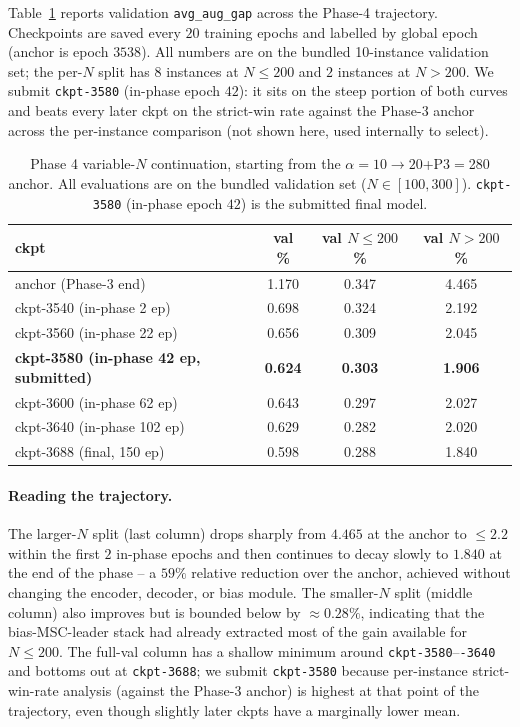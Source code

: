 \documentclass[11pt,a4paper]{article}
\begin{document}
Table~\ref{tab:p4} reports validation \texttt{avg\_aug\_gap} across the
Phase-4 trajectory. Checkpoints are saved every $20$ training epochs and
labelled by global epoch (anchor is epoch $3538$). All numbers are on
the bundled 10-instance validation set; the per-$N$ split has $8$
instances at $N\!\le\!200$ and $2$ instances at $N\!>\!200$. We submit
\texttt{ckpt-3580} (in-phase epoch $42$): it sits on the steep portion
of both curves and beats every later ckpt on the strict-win rate against
the Phase-3 anchor across the per-instance comparison (not shown here,
used internally to select).

\begin{table}[t]
\centering
\caption{Phase 4 variable-$N$ continuation, starting from the
$\alpha\!=\!10\!\to\!20$+P3$=$280 anchor. All evaluations are on the
bundled validation set ($N\!\in\![100,300]$). \texttt{ckpt-3580}
(in-phase epoch $42$) is the submitted final model.}
\label{tab:p4}
\small
\begin{tabular}{l c c c}
\toprule
ckpt          & val \%   & val $N\!\le\!200$ \% & val $N\!>\!200$ \% \\
\midrule
anchor (Phase-3 end)               & 1.170 & 0.347 & 4.465 \\
\midrule
ckpt-3540 (in-phase 2 ep)          & 0.698 & 0.324 & 2.192 \\
ckpt-3560 (in-phase 22 ep)         & 0.656 & 0.309 & 2.045 \\
\rowcolor{sdmblue!10}
\textbf{ckpt-3580 (in-phase 42 ep, submitted)} & \textbf{0.624} & \textbf{0.303} & \textbf{1.906} \\
ckpt-3600 (in-phase 62 ep)         & 0.643 & 0.297 & 2.027 \\
ckpt-3640 (in-phase 102 ep)        & 0.629 & 0.282 & 2.020 \\
ckpt-3688 (final, 150 ep)          & 0.598 & 0.288 & 1.840 \\
\bottomrule
\end{tabular}
\end{table}

\paragraph{Reading the trajectory.} The larger-$N$ split (last column)
drops sharply from $4.465$ at the anchor to $\le 2.2$ within the first
$2$ in-phase epochs and then continues to decay slowly to $1.840$ at
the end of the phase -- a $59\%$ relative reduction over the anchor,
achieved without changing the encoder, decoder, or bias module. The
smaller-$N$ split (middle column) also improves but is bounded below by
$\approx 0.28\%$, indicating that the bias-MSC-leader stack had already
extracted most of the gain available for $N\!\le\!200$. The full-val
column has a shallow minimum around \texttt{ckpt-3580}--\texttt{-3640}
and bottoms out at \texttt{ckpt-3688}; we submit \texttt{ckpt-3580}
because per-instance strict-win-rate analysis (against the Phase-3
anchor) is highest at that point of the trajectory, even though slightly
later ckpts have a marginally lower mean.
\end{document}

